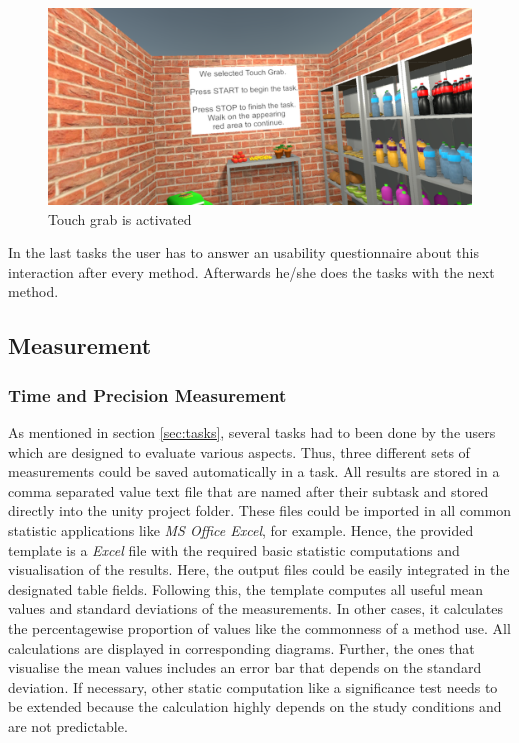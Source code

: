 \begin{figure}[H] 
	\center 
	\includegraphics[width=12cm]{Images/TaskWall_2.PNG}
	\caption[Touch grab is activated]{Touch grab is activated}
	\label{fig:taskW2}
\end{figure}

In the last tasks the user has to answer an usability questionnaire about this interaction after every method. Afterwards he/she does the tasks with the next method. \\

\subsection{Measurement} \label{sec:measurement}

\subsubsection{Time and Precision Measurement}
As mentioned in section \ref{sec:tasks}, several tasks had to been done by the users which are designed to evaluate various aspects. Thus, three different sets of measurements could be saved automatically in a task. All results are stored in a comma separated value text file that are named after their subtask and stored directly into the unity project folder. These files could be imported in all common statistic applications like \textit{MS Office Excel}, for example. Hence, the provided template is a \textit{Excel} file with the required basic statistic computations and visualisation of the results. Here, the output files could be easily integrated in the designated table fields. Following this, the template computes all useful mean values and standard deviations of the measurements. In other cases, it calculates the percentagewise proportion of values like the commonness of a method use. All calculations are displayed in corresponding diagrams. Further, the ones that visualise the mean values includes an error bar that depends on the standard deviation. If necessary, other static computation like a significance test needs to be extended because the calculation highly depends on the study conditions and are not predictable.

